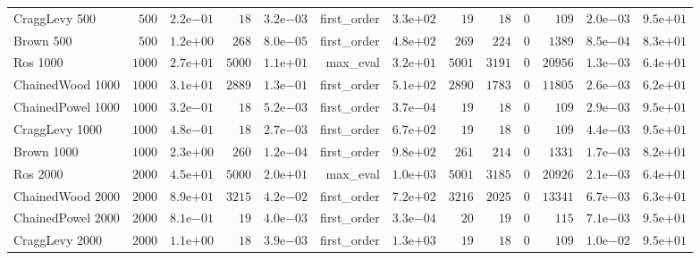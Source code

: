 \begin{longtable}[c]{lrrrrrrrrrrrr}
CraggLevy 500 & \(  500\) & \( 2.2\)e\(-01\) & \(   18\) & \( 3.2\)e\(-03\) & first\_order & \( 3.3\)e\(+02\) & \(   19\) & \(   18\) & \(    0\) & \(  109\) & \( 2.0\)e\(-03\) & \( 9.5\)e\(+01\) \\
Brown 500 & \(  500\) & \( 1.2\)e\(+00\) & \(  268\) & \( 8.0\)e\(-05\) & first\_order & \( 4.8\)e\(+02\) & \(  269\) & \(  224\) & \(    0\) & \( 1389\) & \( 8.5\)e\(-04\) & \( 8.3\)e\(+01\) \\
Ros 1000 & \( 1000\) & \( 2.7\)e\(+01\) & \( 5000\) & \( 1.1\)e\(+01\) & max\_eval & \( 3.2\)e\(+01\) & \( 5001\) & \( 3191\) & \(    0\) & \(20956\) & \( 1.3\)e\(-03\) & \( 6.4\)e\(+01\) \\
ChainedWood 1000 & \( 1000\) & \( 3.1\)e\(+01\) & \( 2889\) & \( 1.3\)e\(-01\) & first\_order & \( 5.1\)e\(+02\) & \( 2890\) & \( 1783\) & \(    0\) & \(11805\) & \( 2.6\)e\(-03\) & \( 6.2\)e\(+01\) \\
ChainedPowel 1000 & \( 1000\) & \( 3.2\)e\(-01\) & \(   18\) & \( 5.2\)e\(-03\) & first\_order & \( 3.7\)e\(-04\) & \(   19\) & \(   18\) & \(    0\) & \(  109\) & \( 2.9\)e\(-03\) & \( 9.5\)e\(+01\) \\
CraggLevy 1000 & \( 1000\) & \( 4.8\)e\(-01\) & \(   18\) & \( 2.7\)e\(-03\) & first\_order & \( 6.7\)e\(+02\) & \(   19\) & \(   18\) & \(    0\) & \(  109\) & \( 4.4\)e\(-03\) & \( 9.5\)e\(+01\) \\
Brown 1000 & \( 1000\) & \( 2.3\)e\(+00\) & \(  260\) & \( 1.2\)e\(-04\) & first\_order & \( 9.8\)e\(+02\) & \(  261\) & \(  214\) & \(    0\) & \( 1331\) & \( 1.7\)e\(-03\) & \( 8.2\)e\(+01\) \\
Ros 2000 & \( 2000\) & \( 4.5\)e\(+01\) & \( 5000\) & \( 2.0\)e\(+01\) & max\_eval & \( 1.0\)e\(+03\) & \( 5001\) & \( 3185\) & \(    0\) & \(20926\) & \( 2.1\)e\(-03\) & \( 6.4\)e\(+01\) \\
ChainedWood 2000 & \( 2000\) & \( 8.9\)e\(+01\) & \( 3215\) & \( 4.2\)e\(-02\) & first\_order & \( 7.2\)e\(+02\) & \( 3216\) & \( 2025\) & \(    0\) & \(13341\) & \( 6.7\)e\(-03\) & \( 6.3\)e\(+01\) \\
ChainedPowel 2000 & \( 2000\) & \( 8.1\)e\(-01\) & \(   19\) & \( 4.0\)e\(-03\) & first\_order & \( 3.3\)e\(-04\) & \(   20\) & \(   19\) & \(    0\) & \(  115\) & \( 7.1\)e\(-03\) & \( 9.5\)e\(+01\) \\
CraggLevy 2000 & \( 2000\) & \( 1.1\)e\(+00\) & \(   18\) & \( 3.9\)e\(-03\) & first\_order & \( 1.3\)e\(+03\) & \(   19\) & \(   18\) & \(    0\) & \(  109\) & \( 1.0\)e\(-02\) & \( 9.5\)e\(+01\) \\

\end{longtable}
